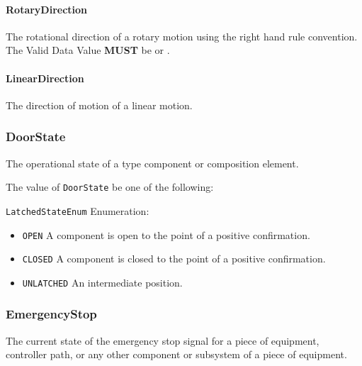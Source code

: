 \paragraph{RotaryDirection}\mbox{}
\label{sec:RotaryDirection}


The rotational direction of a rotary motion using the right hand rule convention.
 The \gls{Valid Data Value} \textbf{MUST} be  or .


\paragraph{LinearDirection}\mbox{}
\label{sec:LinearDirection}


The direction of motion of a linear motion.


\subsubsection{DoorState}
\label{sec:DoorState}



The operational state of a  type component or composition element.


The value of \texttt{DoorState} \MUST be one of the following: 


\texttt{LatchedStateEnum} Enumeration:

\begin{itemize}
\item \texttt{OPEN} \newline A component is open to the point of a positive confirmation. 
\item \texttt{CLOSED} \newline A component is closed to the point of a positive confirmation. 
\item \texttt{UNLATCHED} \newline An intermediate position. 
\end{itemize}

\FloatBarrier

\subsubsection{EmergencyStop}
\label{sec:EmergencyStop}



The current state of the emergency stop signal for a piece of equipment, controller path, or any other component or subsystem of a piece of equipment.


